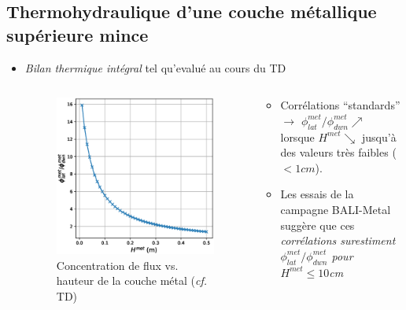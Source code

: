 \subsection{Thermohydraulique d'une couche métallique supérieure mince}
\begin{frame}[fragile]
\begin{itemize}
\item \emph{Bilan thermique intégral} tel qu'evalué au cours du TD
\begin{columns}[T]
    \begin{column}{0.25\textwidth}
\begin{figure}[H]
\centering \includegraphics[width=\textwidth]{Figures/Varying_Hmet_2.eps} \\
{\tiny Concentration de flux vs. hauteur de la couche métal (\textit{cf.} TD)}
\end{figure}
    \end{column}
    \begin{column}{0.75\textwidth}
\begin{itemize}
\item Corrélations ``standards'' $\rightarrow$ $\phi^{met}_{lat}/\phi^{met}_{dwn} \nearrow$ lorsque $H^{met} \searrow$ jusqu'à des valeurs très faibles ($<1cm$).
\item Les essais de la campagne BALI-Metal suggère que ces \emph{corrélations surestiment $\phi^{met}_{lat}/\phi^{met}_{dwn}$ pour $H^{met} \le 10$cm}

\end{itemize}
\end{column}
\end{columns}
\end{itemize}
\end{frame}
